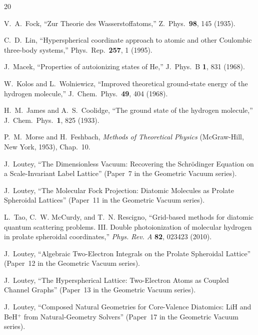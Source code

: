 \documentclass[aps,pra,twocolumn,superscriptaddress,longbibliography]{revtex4-2}
\begin{document}
\begin{thebibliography}{20}

V.~A.~Fock,
``Zur Theorie des Wasserstoffatoms,''
Z.~Phys.\ \textbf{98}, 145 (1935).

C.~D.~Lin,
``Hyperspherical coordinate approach to atomic and other
Coulombic three-body systems,''
Phys.\ Rep.\ \textbf{257}, 1 (1995).

J.~Macek,
``Properties of autoionizing states of He,''
J.~Phys.\ B \textbf{1}, 831 (1968).

W.~Kolos and L.~Wolniewicz,
``Improved theoretical ground-state energy of the hydrogen molecule,''
J.~Chem.\ Phys.\ \textbf{49}, 404 (1968).

H.~M.~James and A.~S.~Coolidge,
``The ground state of the hydrogen molecule,''
J.~Chem.\ Phys.\ \textbf{1}, 825 (1933).

P.~M.~Morse and H.~Feshbach,
\emph{Methods of Theoretical Physics}
(McGraw-Hill, New York, 1953), Chap.~10.

J.~Loutey,
``The Dimensionless Vacuum: Recovering the Schr\"odinger Equation
on a Scale-Invariant Label Lattice'' (Paper~7 in the Geometric Vacuum series).

J.~Loutey,
``The Molecular Fock Projection: Diatomic Molecules as Prolate
Spheroidal Lattices'' (Paper~11 in the Geometric Vacuum series).

L.~Tao, C.~W. McCurdy, and T.~N. Rescigno,
``Grid-based methods for diatomic quantum scattering problems.
III. Double photoionization of molecular hydrogen in prolate
spheroidal coordinates,''
\emph{Phys. Rev. A} \textbf{82}, 023423 (2010).

J.~Loutey,
``Algebraic Two-Electron Integrals on the Prolate Spheroidal
Lattice''
(Paper~12 in the Geometric Vacuum series).

J.~Loutey,
``The Hyperspherical Lattice: Two-Electron Atoms as Coupled
Channel Graphs'' (Paper~13 in the Geometric Vacuum series).

J.~Loutey,
``Composed Natural Geometries for Core-Valence Diatomics:
LiH and BeH$^+$ from Natural-Geometry Solvers''
(Paper~17 in the Geometric Vacuum series).


\end{thebibliography}
\end{document}
